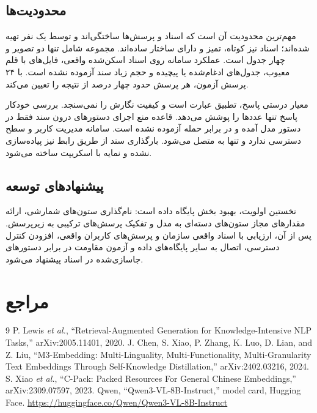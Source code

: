\documentclass[a4paper,12pt,oneside]{book}
\newcommand{\en}[1]{\lr{#1}}
\begin{document}
\section{محدودیت‌ها}\label{sec:limits}

مهم‌ترین محدودیت آن است که اسناد و پرسش‌ها ساختگی‌اند و توسط یک نفر تهیه شده‌اند؛ اسناد نیز کوتاه، تمیز و دارای ساختار ساده‌اند. مجموعه شامل تنها دو تصویر و چهار جدول است. عملکرد سامانه روی اسناد اسکن‌شده واقعی، فایل‌های \en{PDF} با قلم معیوب، جدول‌های ادغام‌شده یا پیچیده و حجم زیاد سند آزموده نشده است. با ۲۴ پرسش آزمون، هر پرسش حدود چهار درصد از نتیجه را تعیین می‌کند.

معیار درستی پاسخ، تطبیق عبارت است و کیفیت نگارش را نمی‌سنجد. بررسی خودکار پاسخ تنها عددها را پوشش می‌دهد. قاعده منع اجرای دستورهای درون سند فقط در دستور مدل آمده و در برابر حمله آزموده نشده است. سامانه مدیریت کاربر و سطح دسترسی ندارد و تنها به \en{SQLite} متصل می‌شود. بارگذاری سند از طریق رابط نیز پیاده‌سازی نشده و نمایه با اسکریپت ساخته می‌شود.

\section{پیشنهادهای توسعه}

نخستین اولویت، بهبود بخش پایگاه داده است: نام‌گذاری ستون‌های شمارشی، ارائه مقدارهای مجاز ستون‌های دسته‌ای به مدل و تفکیک پرسش‌های ترکیبی به زیرپرسش. پس از آن، ارزیابی با اسناد واقعی سازمان و پرسش‌های کاربران واقعی، افزودن کنترل دسترسی، اتصال به سایر پایگاه‌های داده و آزمون مقاومت در برابر دستورهای جاسازی‌شده در اسناد پیشنهاد می‌شود.

\chapter*{مراجع}

\begingroup
\small
{}
\begin{latin}
\renewcommand{\chapter}[2]{}
\begin{thebibliography}{9}
 P. Lewis \textit{et al.}, ``Retrieval-Augmented Generation for Knowledge-Intensive NLP Tasks,'' arXiv:2005.11401, 2020.
 J. Chen, S. Xiao, P. Zhang, K. Luo, D. Lian, and Z. Liu, ``M3-Embedding: Multi-Linguality, Multi-Functionality, Multi-Granularity Text Embeddings Through Self-Knowledge Distillation,'' arXiv:2402.03216, 2024.
 S. Xiao \textit{et al.}, ``C-Pack: Packed Resources For General Chinese Embeddings,'' arXiv:2309.07597, 2023.
 Qwen, ``Qwen3-VL-8B-Instruct,'' model card, Hugging Face. \url{https://huggingface.co/Qwen/Qwen3-VL-8B-Instruct}
\end{thebibliography}
\end{latin}
\endgroup
\end{document}
